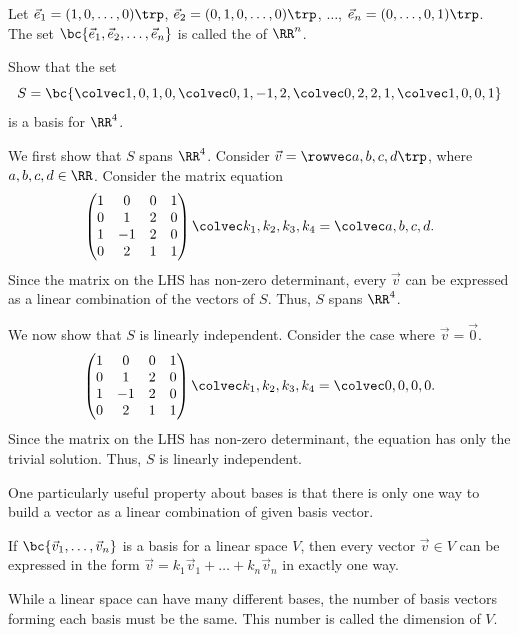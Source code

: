 \begin{definition}
    Let $\vec e_1 = (1, 0, \dots, 0)\trp$, $\vec e_2 = (0, 1, 0, \dots, 0)\trp$, $\dots$, $\vec e_n = (0, \dots, 0, 1)\trp$. The set $\bc{\vec e_1, \vec e_2, \dots, \vec e_n}$ is called the  of $\RR^n$.
\end{definition}

\begin{sample}
    Show that the set \[S = \bc{\cveciv1010, \cveciv01{-1}2, \cveciv0221, \cveciv1001}\] is a basis for $\RR^4$.
\end{sample}
\begin{sampans}
    We first show that $S$ spans $\RR^4$. Consider $\vec v = \cvecivx{a}{b}{c}{d}$, where $a, b, c, d \in \RR$. Consider the matrix equation \[\begin{pmatrix}1 & 0 & 0 & 1\\ 0 & 1 & 2 & 0 \\ 1 & -1 & 2 & 0 \\ 0 & 2 & 1 & 1\end{pmatrix}\cveciv{k_1}{k_2}{k_3}{k_4} = \cveciv{a}{b}{c}{d}.\] Since the matrix on the LHS has non-zero determinant, every $\vec v$ can be expressed as a linear combination of the vectors of $S$. Thus, $S$ spans $\RR^4$.

    We now show that $S$ is linearly independent. Consider the case where $\vec v = \vec 0$. \[\begin{pmatrix}1 & 0 & 0 & 1\\ 0 & 1 & 2 & 0 \\ 1 & -1 & 2 & 0 \\ 0 & 2 & 1 & 1\end{pmatrix}\cveciv{k_1}{k_2}{k_3}{k_4} = \cveciv0000.\] Since the matrix on the LHS has non-zero determinant, the equation has only the trivial solution. Thus, $S$ is linearly independent.
\end{sampans}

One particularly useful property about bases is that there is only one way to build a vector as a linear combination of given basis vector.

\begin{theorem}
    If $\bc{\vec v_1, \dots, \vec v_n}$ is a basis for a linear space $V$, then every vector $\vec v \in V$ can be expressed in the form $\vec v = k_1 \vec v_1 + \dots + k_n \vec v_n$ in exactly one way.
\end{theorem}

While a linear space can have many different bases, the number of basis vectors forming each basis must be the same. This number is called the dimension of $V$.

